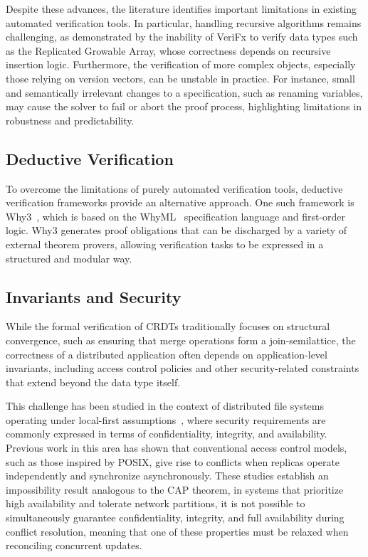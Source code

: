 Despite these advances, the literature identifies important limitations in existing automated verification tools. In particular, handling recursive algorithms remains challenging, as demonstrated by the inability of VeriFx to verify data types such as the Replicated Growable Array, whose correctness depends on recursive insertion logic. Furthermore, the verification of more complex objects, especially those relying on version vectors, can be unstable in practice. For instance, small and semantically irrelevant changes to a specification, such as renaming variables, may cause the solver to fail or abort the proof process, highlighting limitations in robustness and predictability.

\subsection{Deductive Verification}
\label{sub:deductive}

To overcome the limitations of purely automated verification tools, deductive verification frameworks provide an alternative approach. One such framework is Why3~\cite{why3}, which is based on the WhyML~\cite{whyml} specification language and first-order logic. Why3 generates proof obligations that can be discharged by a variety of external theorem provers, allowing verification tasks to be expressed in a structured and modular way.

\subsection{Invariants and Security}
\label{sub:invariants_security}

While the formal verification of CRDTs traditionally focuses on structural convergence, such as ensuring that merge operations form a join-semilattice, the correctness of a distributed application often depends on application-level invariants, including access control policies and other security-related constraints that extend beyond the data type itself.

This challenge has been studied in the context of distributed file systems operating under local-first assumptions~\cite{yanakieva2021access}, where security requirements are commonly expressed in terms of confidentiality, integrity, and availability. Previous work in this area has shown that conventional access control models, such as those inspired by POSIX, give rise to conflicts when replicas operate independently and synchronize asynchronously. These studies establish an impossibility result analogous to the CAP theorem, in systems that prioritize high availability and tolerate network partitions, it is not possible to simultaneously guarantee confidentiality, integrity, and full availability during conflict resolution, meaning that one of these properties must be relaxed when reconciling concurrent updates.

